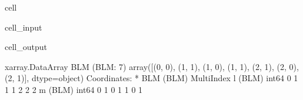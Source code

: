 \documentclass[letterpaper,table,10pt,english]{jupyterBook}
\begin{document}
\begin{sphinxuseclass}{cell}\begin{sphinxVerbatimInput}

\begin{sphinxuseclass}{cell_input}
\begin{sphinxVerbatim}[commandchars=\\\{\}]

\end{sphinxVerbatim}

\end{sphinxuseclass}\end{sphinxVerbatimInput}
\begin{sphinxVerbatimOutput}

\begin{sphinxuseclass}{cell_output}
\begin{sphinxVerbatim}[commandchars=\\\{\}]
\PYGZlt{}xarray.DataArray \PYGZsq{}BLM\PYGZsq{} (BLM: 7)\PYGZgt{}
array([(0, 0), (1, \PYGZhy{}1), (1, 0), (1, 1), (2, \PYGZhy{}1), (2, 0), (2, 1)], dtype=object)
Coordinates:
  * BLM      (BLM) MultiIndex
  \PYGZhy{} l        (BLM) int64 0 1 1 1 2 2 2
  \PYGZhy{} m        (BLM) int64 0 \PYGZhy{}1 0 1 \PYGZhy{}1 0 1
\end{sphinxVerbatim}

\end{sphinxuseclass}\end{sphinxVerbatimOutput}

\end{sphinxuseclass}
\end{document}
